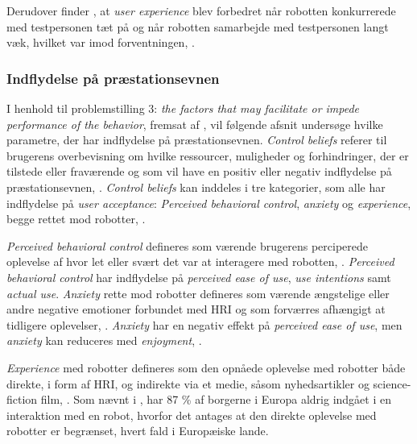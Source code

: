 Derudover finder \textcite[s. 785]{PDF:HowSocialDistanceShapesHRI}, at \textit{user experience} blev forbedret når robotten konkurrerede med testpersonen tæt på og når robotten samarbejde med testpersonen langt væk, hvilket var imod forventningen, \parencite[s. 785]{PDF:HowSocialDistanceShapesHRI}.   
%
\subsubsection*{Indflydelse på præstationsevnen}
\label{InteraktionSocialeRobotterParametrePraestation}
%
I henhold til problemstilling 3: \textit{the factors that may facilitate or impede performance of the behavior}, fremsat af \textcite[s. 1477]{PDF:SharingALifeHarvey}, vil følgende afsnit undersøge hvilke parametre, der har indflydelse på præstationsevnen.\blankline
%
\textit{Control beliefs} referer til brugerens overbevisning om hvilke ressourcer, muligheder og forhindringer, der er tilstede eller fraværende og som vil have en positiv eller negativ indflydelse på præstationsevnen, \parencite[s. 1478]{PDF:ExploringInfluencingVariable}. \textit{Control beliefs} kan inddeles i tre kategorier, som alle har indflydelse på \textit{user acceptance}: \textit{Perceived behavioral control}, \textit{anxiety} og \textit{experience}, begge rettet mod robotter, \parencite[s. 1478]{PDF:ExploringInfluencingVariable}. 

\textit{Perceived behavioral control} defineres som værende brugerens perciperede oplevelse af hvor let eller svært det var at interagere med robotten, \parencite[s. 1478]{PDF:ExploringInfluencingVariable}. \textit{Perceived behavioral control} har indflydelse på \textit{perceived ease of use}, \textit{use intentions} samt \textit{actual use}. \textit{Anxiety} rette mod robotter defineres som værende ængstelige eller andre negative emotioner forbundet med HRI og som forværres afhængigt at tidligere oplevelser, \parencite[s. 1478]{PDF:ExploringInfluencingVariable}. \textit{Anxiety} har en negativ effekt på \textit{perceived ease of use}, men \textit{anxiety} kan reduceres med \textit{enjoyment}, \parencite[s. 1478]{PDF:ExploringInfluencingVariable}. 

\textit{Experience} med robotter defineres som den opnåede oplevelse med robotter både direkte, i form af HRI, og indirekte via et medie, såsom nyhedsartikler og science-fiction film, \parencite[s. 1479]{PDF:ExploringInfluencingVariable}. Som nævnt i , har 87 \% af borgerne i Europa aldrig indgået i en interaktion med en robot, hvorfor det antages at den direkte oplevelse med robotter er begrænset, hvert fald i Europæiske lande.

